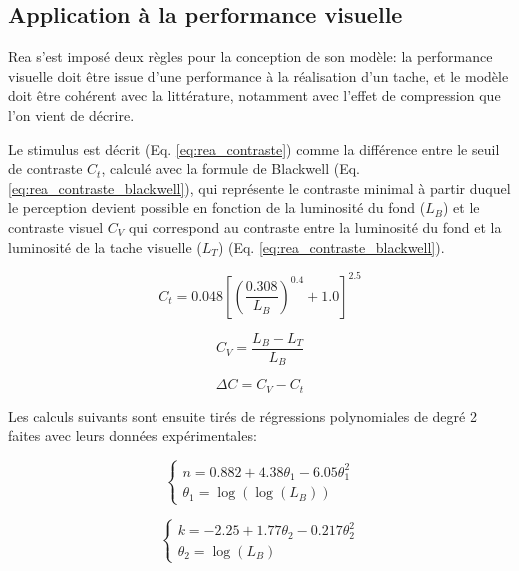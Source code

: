 	\subsection{Application à la performance visuelle}
	\par Rea s'est imposé deux règles pour la conception de son modèle: la performance visuelle doit être issue d'une performance à la réalisation d'un tache, et le modèle doit être cohérent avec la littérature, notamment avec l'effet de compression que l'on vient de décrire.
	
	\par Le stimulus est décrit (Eq. \ref{eq:rea_contraste}) comme la différence entre le seuil de contraste $C_t$, calculé avec la formule de Blackwell (Eq. \ref{eq:rea_contraste_blackwell}), qui représente le contraste minimal à partir duquel le perception devient possible en fonction de la luminosité du fond ($L_B$) et le contraste visuel $C_V$ qui correspond au contraste entre la luminosité du fond et la luminosité de la tache visuelle ($L_T$) (Eq. \ref{eq:rea_contraste_blackwell}).
	
	\begin{equation}
		C_t = 0.048\left[\left(\frac{0.308}{L_B}\right)^{0.4} + 1.0\right]^{2.5}
		\label{eq:rea_contraste_blackwell}
	\end{equation}
	
	\begin{equation}
		C_V = \frac{L_B - L_T}{L_B}
		\label{eq:rea_contraste_visuel}
	\end{equation}
	
	\begin{equation}
		\Delta C = C_V - C_t
		\label{eq:rea_contraste}
	\end{equation}
	
	\par Les calculs suivants sont ensuite tirés de régressions polynomiales de degré 2 faites avec leurs données expérimentales:
	
	\begin{equation}
		\begin{cases}
		n =  0.882 + 4.38 \theta_1 - 6.05 \theta_1^2\\
		\theta_1 = \log(\log(L_B))
		\end{cases} 
		\label{eq:rea_n}
	\end{equation}
	
	\begin{equation}
		\begin{cases}
		k =  -2.25 + 1.77 \theta_2 - 0.217 \theta_2^2\\
		\theta_2 = \log(L_B)
		\end{cases} 
		\label{eq:rea_k}
	\end{equation}
	
